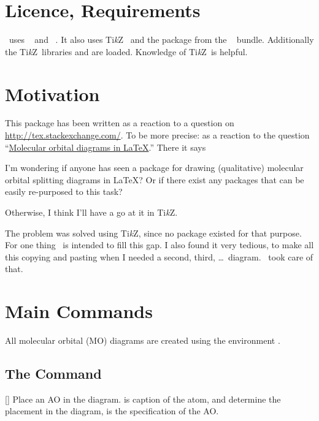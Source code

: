\documentclass[load-preamble+]{cnltx-doc}
\newcommand*\TikZ{Ti\textit{k}Z}
\begin{document}
\section{Licence, Requirements}
\license

\modiagram\ uses ~\cite{bnd:l3kernel} and
~\cite{bnd:l3packages}. It also uses \TikZ~\cite{pkg:pgf} and
the package  from the ~\cite{bnd:chemmacros}
bundle.  Additionally the \TikZ\ libraries  and  are
loaded.  Knowledge of \TikZ\ is helpful.

\section{Motivation}
This package has been written as a reaction to a question on
\url{http://tex.stackexchange.com/}. To be more precise: as a reaction to the
question
``\href{http://tex.stackexchange.com/questions/13863/molecular-orbital-diagrams-in-latex}%
{Molecular orbital diagrams in LaTeX}.'' There it says
\begin{cnltxquote}
  I'm wondering if anyone has seen a package for drawing (qualitative)
  molecular orbital splitting diagrams in \LaTeX? Or if there exist any
  packages that can be easily re-purposed to this task?

  Otherwise, I think I'll have a go at it in \TikZ.
\end{cnltxquote}
The problem was solved using \TikZ, since no package existed for that purpose.
For one thing \modiagram\ is intended to fill this gap. I also found it very
tedious, to make all this copying and pasting when I needed a second, third,
\ldots\ diagram. \modiagram\ took care of that.


\section{Main Commands}
All molecular orbital (MO) diagrams are created using the environment
.

\subsection{The  Command}
\begin{commands}
  []
    Place an \acs{AO} in the diagram.  is caption of the atom,
     and  determine the placement in the diagram,
     is the specification of the \ac{AO}.
\end{commands}
\end{document}
